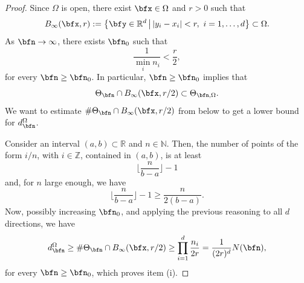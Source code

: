 \documentclass{amsart}
\begin{document}
\begin{proof}
    Since $\Omega$ is open, there exist $\bfx\in\Omega$ and $r>0$ such that
    \begin{equation*}
        B_{\infty}(\bfx,r):=\left\{\bfy\in\mathbb{R}^d\,\big\vert\,|y_i-x_i|<r,\,\, i=1,\dots,d\right\}\subset\Omega.
    \end{equation*}
    As $\bfn\to\infty$, there exists $\bfn_0$ such that 
    \begin{equation*}
        \frac{1}{\min_{i}n_i}<\frac r2,
    \end{equation*}
    for every $\bfn\geq\bfn_0$. In particular, $\bfn\geq\bfn_0$ implies that
    \begin{equation*}
        \Theta_\bfn\cap B_{\infty}(\bfx,r/2)\subset\Theta_{\bfn,\Omega}.
    \end{equation*}
    We want to estimate $\#\Theta_\bfn\cap B_{\infty}(\bfx,r/2)$ from below to get a lower bound for $d_\bfn^{\Omega}$. 
    
    Consider an interval $(a,b)\subset\mathbb{R}$ and $n\in\mathbb{N}$. Then, the number of points of the form $i/n$, with $i\in\mathbb{Z}$, contained in $(a,b)$, is at least
    \begin{equation*}
        \bigg\lfloor\frac{n}{b-a}\bigg\rfloor-1
    \end{equation*}
    and, for $n$ large enough, we have
    \begin{equation*}
        \bigg\lfloor\frac{n}{b-a}\bigg\rfloor-1\geq\frac{n}{2(b-a)}.
    \end{equation*}
    Now, possibly increasing $\bfn_0$, and applying the previous reasoning to all $d$ directions, we have 
    \begin{equation*}
        d_\bfn^{\Omega}\geq\#\Theta_\bfn\cap B_{\infty}(\bfx,r/2)\geq\prod\limits_{i=1}^d\frac{n_i}{2r}=\frac1{(2r)^d}N(\bfn),
    \end{equation*}
    for every $\bfn\geq\bfn_0$, which proves item (i). 
    

\end{proof}
\end{document}
